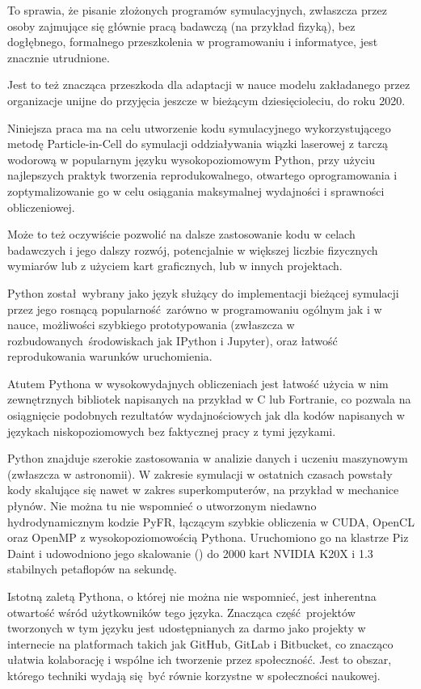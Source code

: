 To sprawia, że pisanie złożonych programów symulacyjnych, zwłaszcza przez osoby
zajmujące się głównie pracą badawczą (na przykład fizyką), bez dogłębnego, formalnego przeszkolenia
w programowaniu i informatyce, jest znacznie utrudnione.

Jest to też znacząca przeszkoda dla adaptacji
w nauce modelu  zakładanego przez organizacje unijne
do przyjęcia jeszcze w bieżącym dziesięcioleciu, do roku 2020.

Niniejsza praca ma na celu utworzenie kodu symulacyjnego wykorzystującego metodę Particle-in-Cell
do symulacji oddziaływania wiązki laserowej z tarczą wodorową w popularnym języku
wysokopoziomowym Python, przy użyciu najlepszych praktyk tworzenia reprodukowalnego, otwartego oprogramowania
i zoptymalizowanie go w celu osiągania maksymalnej wydajności i sprawności obliczeniowej.

Może to też oczywiście pozwolić na dalsze
zastosowanie kodu w celach badawczych i jego dalszy rozwój, potencjalnie w większej
liczbie fizycznych wymiarów lub z
użyciem kart graficznych,
lub w innych projektach.

Python został wybrany jako język służący do implementacji bieżącej symulacji
przez jego rosnącą popularność zarówno w programowaniu ogólnym jak i w nauce,
możliwości szybkiego prototypowania (zwłaszcza w rozbudowanych środowiskach jak
IPython\cite{ipython} i Jupyter\cite{jupyter}), oraz łatwość reprodukowania
warunków uruchomienia.

Atutem Pythona w wysokowydajnych obliczeniach jest łatwość użycia w
nim zewnętrznych bibliotek napisanych na przykład w C lub Fortranie, co
pozwala na osiągnięcie podobnych rezultatów wydajnościowych jak dla kodów
napisanych w językach niskopoziomowych bez faktycznej pracy z tymi
językami.

Python znajduje szerokie zastosowania w analizie danych i uczeniu maszynowym
(zwłaszcza w astronomii\cite{astropy}). W zakresie symulacji w ostatnich czasach powstały
kody skalujące się nawet w zakres superkomputerów, na przykład w mechanice
płynów.  Nie można tu nie wspomnieć o utworzonym niedawno hydrodynamicznym kodzie
PyFR, łączącym szybkie obliczenia w CUDA, OpenCL oraz OpenMP z wysokopoziomowością Pythona. Uruchomiono go na klastrze Piz Daint
i udowodniono jego skalowanie () do 2000 kart NVIDIA K20X i 1.3 stabilnych petaflopów na sekundę.~\cite{pyfr}~\cite{pyfr-euroscipy}

Istotną zaletą Pythona, o której nie można nie wspomnieć, jest inherentna
otwartość wśród użytkowników tego języka. Znacząca część projektów tworzonych w
tym języku jest udostępnianych za darmo jako projekty  w
internecie na platformach takich jak GitHub, GitLab i Bitbucket, co znacząco
ułatwia kolaborację i wspólne ich tworzenie przez społeczność.  Jest to obszar,
którego techniki wydają się być równie korzystne w społeczności naukowej.

